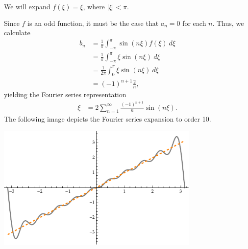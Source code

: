 \documentclass[10pt]{mypackage}
\begin{document}
\begin{example}
  We will expand $f\left(\xi\right) = \xi$, where $\left\vert \xi \right\vert < \pi$.\newline

  Since $f$ is an odd function, it must be the case that $a_n = 0$ for each $n$. Thus, we calculate
  \begin{align*}
    b_n &= \frac{1}{\pi}\int_{-\pi}^{\pi} \sin\left(n\xi\right)f\left(\xi\right)\:d\xi\\
        &= \frac{1}{\pi}\int_{-\pi}^{\pi} \xi\sin\left(n\xi\right)\:d\xi\\
        &= \frac{1}{2\pi}\int_{0}^{\pi} \xi\sin\left(n\xi\right)\:d\xi\\
        &= \left(-1\right)^{n+1} \frac{2}{n},
  \end{align*}
  yielding the Fourier series representation
  \begin{align*}
    \xi &= 2\sum_{n=1}^{\infty}\frac{\left(-1\right)^{n+1}}{n}\sin\left(n\xi\right).
  \end{align*}
  The following image depicts the Fourier series expansion to order 10.
  \begin{center}
    \includegraphics[width=10cm]{images/fourier_series_x.pdf}
  \end{center}
\end{example}
\end{document}
